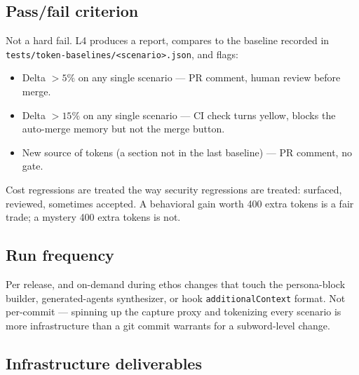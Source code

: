 \documentclass[a4paper,10pt]{article}
\newcommand{\field}[1]{\texttt{#1}}
\newcommand{\fpath}[1]{\texttt{#1}}
\begin{document}
\subsection*{Pass/fail criterion}

Not a hard fail.  L4 produces a report, compares to the baseline
recorded in \fpath{tests/token-baselines/<scenario>.json}, and flags:

\begin{itemize}
  \item Delta $> 5\%$ on any single scenario --- PR comment, human
    review before merge.
  \item Delta $> 15\%$ on any single scenario --- CI check turns
    yellow, blocks the auto-merge memory but not the merge button.
  \item New source of tokens (a section not in the last baseline) ---
    PR comment, no gate.
\end{itemize}

Cost regressions are treated the way security regressions are
treated: surfaced, reviewed, sometimes accepted.  A behavioral gain
worth 400 extra tokens is a fair trade; a mystery 400 extra tokens
is not.

\subsection*{Run frequency}

Per release, and on-demand during ethos changes that touch the
persona-block builder, generated-agents synthesizer, or hook
\field{additionalContext} format.  Not per-commit --- spinning up
the capture proxy and tokenizing every scenario is more
infrastructure than a git commit warrants for a subword-level
change.

\subsection*{Infrastructure deliverables}
\end{document}

